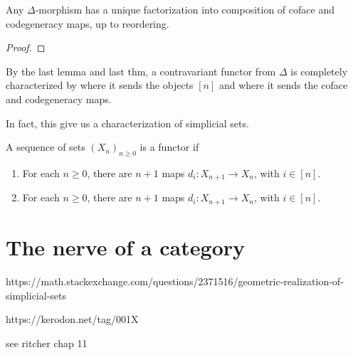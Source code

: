 \begin{lemma}
    Any \(\Delta\)-morphism has a unique factorization into composition of coface and codegeneracy maps, up to reordering.
\end{lemma}
\begin{proof}
    
\end{proof}

By the last lemma and last thm, a contravariant functor from \(\Delta\) is completely characterized by where it sends the objects  \([n]\)   and where it sends the coface and codegeneracy maps.

In fact, this give us a characterization of simplicial sets.

\begin{theorem}
    A sequence of sets  \((X_n)_{n\geq 0}\) is a functor if 
    \begin{enumerate}[label=(\roman*)]
        \item For each \(n\geq 0\), there are \(n+1\) maps \(d_i\colon X_{n+1}\to X_n\), with \(i\in [n]\).
        \item For each \(n\geq 0\), there are \(n+1\) maps \(d_i\colon X_{n+1}\to X_n\), with \(i\in [n]\).
    \end{enumerate}

\end{theorem}

\section{The nerve of a category}

\lipsum[2]

https://math.stackexchange.com/questions/2371516/geometric-realization-of-simplicial-sets

https://kerodon.net/tag/001X

see ritcher chap 11


